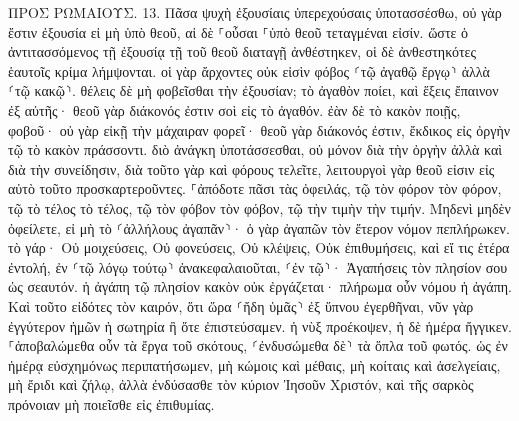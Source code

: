 \documentclass[twoside, 9pt]{extreport}
\begin{document}
ΠΡΟΣ ΡΩΜΑΙΟΥΣ.
13.
Πᾶσα ψυχὴ ἐξουσίαις ὑπερεχούσαις ὑποτασσέσθω, οὐ γὰρ ἔστιν ἐξουσία εἰ μὴ ὑπὸ θεοῦ, αἱ δὲ ⸀οὖσαι ⸀ὑπὸ θεοῦ τεταγμέναι εἰσίν. 
ὥστε ὁ ἀντιτασσόμενος τῇ ἐξουσίᾳ τῇ τοῦ θεοῦ διαταγῇ ἀνθέστηκεν, οἱ δὲ ἀνθεστηκότες ἑαυτοῖς κρίμα λήμψονται. 
οἱ γὰρ ἄρχοντες οὐκ εἰσὶν φόβος ⸂τῷ ἀγαθῷ ἔργῳ⸃ ἀλλὰ ⸂τῷ κακῷ⸃. θέλεις δὲ μὴ φοβεῖσθαι τὴν ἐξουσίαν; τὸ ἀγαθὸν ποίει, καὶ ἕξεις ἔπαινον ἐξ αὐτῆς· 
θεοῦ γὰρ διάκονός ἐστιν σοὶ εἰς τὸ ἀγαθόν. ἐὰν δὲ τὸ κακὸν ποιῇς, φοβοῦ· οὐ γὰρ εἰκῇ τὴν μάχαιραν φορεῖ· θεοῦ γὰρ διάκονός ἐστιν, ἔκδικος εἰς ὀργὴν τῷ τὸ κακὸν πράσσοντι. 
διὸ ἀνάγκη ὑποτάσσεσθαι, οὐ μόνον διὰ τὴν ὀργὴν ἀλλὰ καὶ διὰ τὴν συνείδησιν, 
διὰ τοῦτο γὰρ καὶ φόρους τελεῖτε, λειτουργοὶ γὰρ θεοῦ εἰσιν εἰς αὐτὸ τοῦτο προσκαρτεροῦντες. 
⸀ἀπόδοτε πᾶσι τὰς ὀφειλάς, τῷ τὸν φόρον τὸν φόρον, τῷ τὸ τέλος τὸ τέλος, τῷ τὸν φόβον τὸν φόβον, τῷ τὴν τιμὴν τὴν τιμήν. 
Μηδενὶ μηδὲν ὀφείλετε, εἰ μὴ τὸ ⸂ἀλλήλους ἀγαπᾶν⸃· ὁ γὰρ ἀγαπῶν τὸν ἕτερον νόμον πεπλήρωκεν. 
τὸ γάρ· Οὐ μοιχεύσεις, Οὐ φονεύσεις, Οὐ κλέψεις, Οὐκ ἐπιθυμήσεις, καὶ εἴ τις ἑτέρα ἐντολή, ἐν ⸂τῷ λόγῳ τούτῳ⸃ ἀνακεφαλαιοῦται, ⸂ἐν τῷ⸃· Ἀγαπήσεις τὸν πλησίον σου ὡς σεαυτόν. 
ἡ ἀγάπη τῷ πλησίον κακὸν οὐκ ἐργάζεται· πλήρωμα οὖν νόμου ἡ ἀγάπη. 
Καὶ τοῦτο εἰδότες τὸν καιρόν, ὅτι ὥρα ⸂ἤδη ὑμᾶς⸃ ἐξ ὕπνου ἐγερθῆναι, νῦν γὰρ ἐγγύτερον ἡμῶν ἡ σωτηρία ἢ ὅτε ἐπιστεύσαμεν. 
ἡ νὺξ προέκοψεν, ἡ δὲ ἡμέρα ἤγγικεν. ⸀ἀποβαλώμεθα οὖν τὰ ἔργα τοῦ σκότους, ⸂ἐνδυσώμεθα δὲ⸃ τὰ ὅπλα τοῦ φωτός. 
ὡς ἐν ἡμέρᾳ εὐσχημόνως περιπατήσωμεν, μὴ κώμοις καὶ μέθαις, μὴ κοίταις καὶ ἀσελγείαις, μὴ ἔριδι καὶ ζήλῳ, 
ἀλλὰ ἐνδύσασθε τὸν κύριον Ἰησοῦν Χριστόν, καὶ τῆς σαρκὸς πρόνοιαν μὴ ποιεῖσθε εἰς ἐπιθυμίας. 
\end{document}
